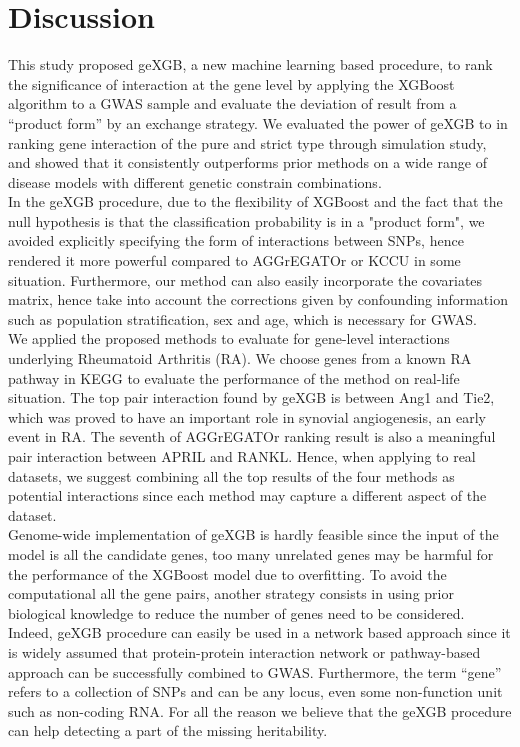 \documentclass[11pt]{article}
\theoremstyle{plain}
\theoremstyle{definition}
\theoremstyle{remark}
\begin{document}
\section{Discussion}


This study proposed geXGB, a new machine learning based procedure, to rank the significance of interaction at the gene level by applying the XGBoost algorithm to a GWAS sample and evaluate the deviation of result from a ``product form'' by an exchange strategy. We evaluated the power of geXGB to in ranking gene interaction of the pure and strict type through simulation study, and showed that it consistently outperforms prior methods on a wide range of disease models with different genetic constrain combinations.\\

\noindent In the geXGB procedure, due to the flexibility of XGBoost and the fact that the null hypothesis is that the classification probability is in a "product form", we avoided explicitly specifying the form of interactions between SNPs, hence rendered it more powerful compared to AGGrEGATOr or KCCU in some situation. Furthermore, our method can also easily incorporate the covariates matrix, hence take into account the corrections given by confounding information such as population stratification, sex and age, which is necessary for GWAS.\\

\noindent We applied the proposed methods to evaluate for gene-level interactions underlying Rheumatoid Arthritis (RA). We choose genes from a known RA pathway in KEGG to evaluate the performance of the method on real-life situation. The top pair interaction found by geXGB is between Ang1 and Tie2, which was proved to have an important role in synovial angiogenesis, an early event in RA. The seventh of AGGrEGATOr ranking result is also a meaningful pair interaction between APRIL and RANKL. Hence, when applying to real datasets, we suggest combining all the top results of the four methods as potential interactions since each method may capture a different aspect of the dataset.\\

\noindent Genome-wide implementation of geXGB is hardly feasible since the input of the model is all the candidate genes, too many unrelated genes may be harmful for the performance of the XGBoost model due to overfitting. To avoid the computational all the gene pairs, another strategy consists in using prior biological knowledge to reduce the number of genes need to be considered. Indeed, geXGB procedure can easily be used in a network based approach since it is widely assumed that protein-protein interaction network or pathway-based approach can be successfully combined to GWAS. Furthermore, the term ``gene'' refers to a collection of SNPs and can be any locus, even some non-function unit such as non-coding RNA. For all the reason we believe that the geXGB procedure can help detecting a part of the missing heritability. \\
\end{document}
